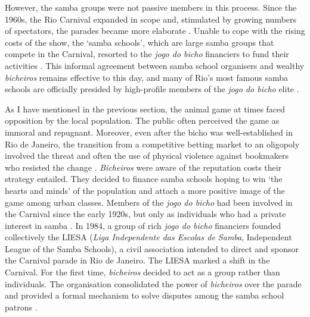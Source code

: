 \documentclass[a4paper,12pt]{article}
\begin{document}
However, the samba groups were not passive members in this process. Since the 1960s, the Rio Carnival expanded in scope and, stimulated by growing numbers of spectators, the parades became more elaborate \citetext{\citealp{cabral2016escolas}; \citealp[214]{chinelli1993vazio}; \citealp[240]{hertzman2013making}}. Unable to cope with the rising costs of the show, the `samba schools', which are large samba groups that compete in the Carnival, resorted to the \emph{jogo do bicho} financiers to fund their activities \citep{misse2007illegal}. This informal agreement between samba school organisers and wealthy \emph{bicheiros} remains effective to this day, and many of Rio's most famous samba schools are officially presided by high-profile members of the \emph{jogo do bicho} elite \citep{bezerra2009mecenato,cavalcanti2006carnaval,farias2013carnival,misse2011crime,queiroz1992carnaval}.

As I have mentioned in the previous section, the animal game at times faced opposition by the local population. The public often perceived the game as immoral and repugnant. Moreover, even after the bicho was well-established in Rio de Janeiro, the transition from a competitive betting market to an oligopoly involved the threat and often the use of physical violence against bookmakers who resisted the change \citetext{\citealp[143]{bezerra2009mecenato}, \citealp[52]{labronici2012paratodos}}. \emph{Bicheiros} were aware of the reputation costs their strategy entailed. They decided to finance samba schools hoping to win `the hearts and minds' of the population and attach a more positive image of the game among urban classes. Members of the \emph{jogo do bicho} had been involved in the Carnival since the early 1920s, but only as individuals who had a private interest in samba \citep[209]{chinelli1993vazio}. In 1984, a group of rich \emph{jogo do bicho} financiers founded collectively the LIESA (\emph{Liga Independente das Escolas de Samba}, Independent League of the Samba Schools), a civil association intended to direct and sponsor the Carnival parade in Rio de Janeiro. The LIESA marked a shift in the Carnival. For the first time, \emph{bicheiros} decided to act as a group rather than individuals. The organisation consolidated the power of \emph{bicheiros} over the parade and provided a formal mechanism to solve disputes among the samba school patrons \citetext{\citealp[43]{cavalcanti2006carnaval}; \citealp[171]{farias2013carnival}; \citealp[55]{labronici2012paratodos}}.
\end{document}
